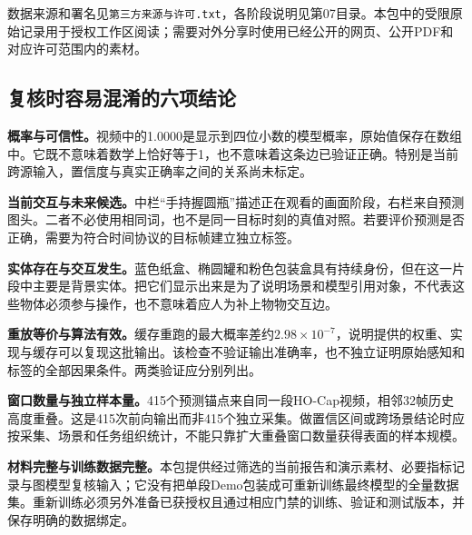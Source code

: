 \documentclass[11pt,a4paper,UTF8,fontset=fandol]{ctexart}
\newcommand{\code}[1]{{\small\nolinkurl{#1}}}
\begin{document}
数据来源和署名见\code{第三方来源与许可.txt}，各阶段说明见第07目录。本包中的受限原始记录用于授权工作区阅读；需要对外分享时使用已经公开的网页、公开PDF和对应许可范围内的素材。

\subsection{复核时容易混淆的六项结论}
\textbf{概率与可信性。}视频中的1.0000是显示到四位小数的模型概率，原始值保存在数组中。它既不意味着数学上恰好等于1，也不意味着这条边已验证正确。特别是当前跨源输入，置信度与真实正确率之间的关系尚未标定。

\textbf{当前交互与未来候选。}中栏“手持握圆瓶”描述正在观看的画面阶段，右栏来自预测图头。二者不必使用相同词，也不是同一目标时刻的真值对照。若要评价预测是否正确，需要为符合时间协议的目标帧建立独立标签。

\textbf{实体存在与交互发生。}蓝色纸盒、椭圆罐和粉色包装盒具有持续身份，但在这一片段中主要是背景实体。把它们显示出来是为了说明场景和模型引用对象，不代表这些物体必须参与操作，也不意味着应人为补上物物交互边。

\textbf{重放等价与算法有效。}缓存重跑的最大概率差约$2.98\times10^{-7}$，说明提供的权重、实现与缓存可以复现这批输出。该检查不验证输出准确率，也不独立证明原始感知和标签的全部因果条件。两类验证应分别列出。

\textbf{窗口数量与独立样本量。}415个预测锚点来自同一段HO-Cap视频，相邻32帧历史高度重叠。这是415次前向输出而非415个独立采集。做置信区间或跨场景结论时应按采集、场景和任务组织统计，不能只靠扩大重叠窗口数量获得表面的样本规模。

\textbf{材料完整与训练数据完整。}本包提供经过筛选的当前报告和演示素材、必要指标记录与图模型复核输入；它没有把单段Demo包装成可重新训练最终模型的全量数据集。重新训练必须另外准备已获授权且通过相应门禁的训练、验证和测试版本，并保存明确的数据绑定。
\end{document}
